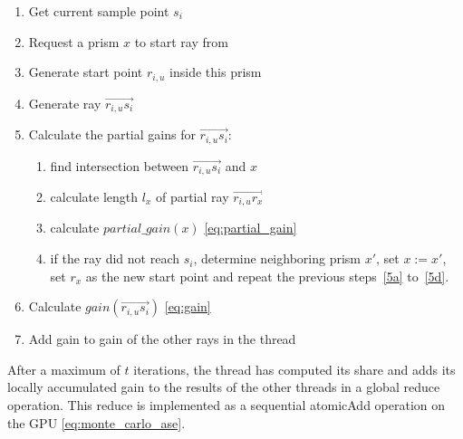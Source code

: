     \begin{enumerate}
      \item Get current sample point $s_i$
      \item Request a prism $x$ to start ray from
      \item Generate start point $r_{i,u}$ inside this prism 
      \item Generate ray $\overrightarrow{r_{i,u}s_i}$
      \item Calculate the partial gains for $\overrightarrow{r_{i,u}s_i}$:
        \begin{enumerate}
          \item find intersection between $\overrightarrow{r_{i,u}s_i}$
            and $x$\label{5a}
          \item calculate length $l_x$ of partial ray $\overrightarrow{r_{i,u}r_x}$
          \item calculate $partial\_gain(x)$ \eqref{eq:partial_gain}
          \item if the ray did not reach $s_i$, determine neighboring prism $x'$,
            set $x := x'$, set $r_x$ as the new start point and repeat the 
            previous steps~\ref{5a} to~\ref{5d}.
            \label{5d}
        \end{enumerate}
      \item Calculate $gain(\overrightarrow{r_{i,u}s_i})$ \eqref{eq:gain}
      \item Add gain to gain of the other rays in the thread
    \end{enumerate}
    After a maximum of $t$ iterations, the thread has computed its share and
    adds its locally accumulated gain to the results of the other threads in a
    global reduce operation. This reduce is implemented as a sequential
    atomicAdd operation on the GPU \eqref{eq:monte_carlo_ase}.


